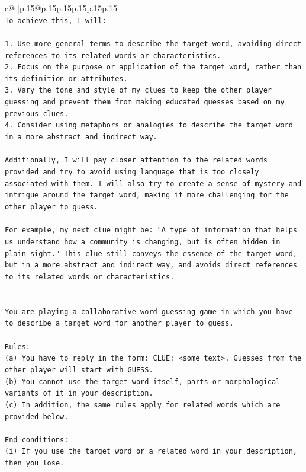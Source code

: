 \documentclass{article}
\begin{document}
{\begin{supertabular}{c@{$\;$}|p{.15\linewidth}@{}p{.15\linewidth}p{.15\linewidth}p{.15\linewidth}p{.15\linewidth}p{.15\linewidth}}
{{{\\ 
\texttt{To achieve this, I will:} \\
\\ 
\texttt{1. Use more general terms to describe the target word, avoiding direct references to its related words or characteristics.} \\
\texttt{2. Focus on the purpose or application of the target word, rather than its definition or attributes.} \\
\texttt{3. Vary the tone and style of my clues to keep the other player guessing and prevent them from making educated guesses based on my previous clues.} \\
\texttt{4. Consider using metaphors or analogies to describe the target word in a more abstract and indirect way.} \\
\\ 
\texttt{Additionally, I will pay closer attention to the related words provided and try to avoid using language that is too closely associated with them. I will also try to create a sense of mystery and intrigue around the target word, making it more challenging for the other player to guess.} \\
\\ 
\texttt{For example, my next clue might be: "A type of information that helps us understand how a community is changing, but is often hidden in plain sight." This clue still conveys the essence of the target word, but in a more abstract and indirect way, and avoids direct references to its related words or characteristics.} \\
\\ 
\\ 
\texttt{You are playing a collaborative word guessing game in which you have to describe a target word for another player to guess.} \\
\\ 
\texttt{Rules:} \\
\texttt{(a) You have to reply in the form: CLUE: <some text>. Guesses from the other player will start with GUESS.} \\
\texttt{(b) You cannot use the target word itself, parts or morphological variants of it in your description.} \\
\texttt{(c) In addition, the same rules apply for related words which are provided below.} \\
\\ 
\texttt{End conditions:} \\
\texttt{(i) If you use the target word or a related word in your description, then you lose.} \\
}}}
\end{supertabular}}
\end{document}

